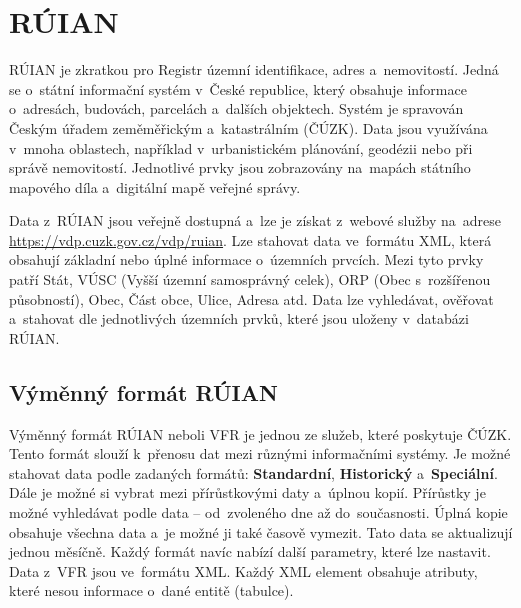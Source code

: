 \section{RÚIAN}
RÚIAN je zkratkou pro Registr územní identifikace, adres a~nemovitostí. 
Jedná se o~státní informační systém v~České republice, který obsahuje 
informace o~adresách, budovách, parcelách a~dalších objektech. Systém 
je spravován Českým úřadem zeměměřickým a~katastrálním (ČÚZK). 
Data jsou využívána v~mnoha oblastech, například v~urbanistickém plánování, 
geodézii nebo při správě nemovitostí. Jednotlivé prvky jsou zobrazovány na~mapách 
státního mapového díla a~digitální mapě veřejné správy.

Data z~RÚIAN jsou veřejně dostupná a~lze je získat z~webové služby na~adrese 
\url{https://vdp.cuzk.gov.cz/vdp/ruian}. Lze stahovat data ve~formátu XML,
která obsahují základní nebo úplné informace o~územních prvcích. Mezi tyto prvky patří
Stát, VÚSC (Vyšší územní samosprávný celek), ORP (Obec s~rozšířenou
působností), Obec, Část obce, Ulice, Adresa atd.
Data lze vyhledávat, ověřovat a~stahovat dle jednotlivých územních prvků, které jsou uloženy v~databázi RÚIAN.

\subsection{Výměnný formát RÚIAN}
Výměnný formát RÚIAN neboli VFR je jednou ze služeb, které poskytuje
ČÚZK. Tento formát slouží k~přenosu dat mezi různými informačními systémy.
Je možné stahovat data podle zadaných formátů: \textbf{Standardní}, \textbf{Historický} a~\textbf{Speciální}.
Dále je možné si vybrat mezi přírůstkovými daty a~úplnou kopií.
Přírůstky je možné vyhledávat podle data -- od~zvoleného dne až do~současnosti.
Úplná kopie obsahuje všechna data a~je možné ji také časově vymezit. Tato data
se aktualizují jednou měsíčně.
Každý formát navíc nabízí další parametry, které lze nastavit.
Data z~VFR jsou ve~formátu XML.
Každý XML element obsahuje atributy, které nesou informace o~dané entitě (tabulce).

\newpage

